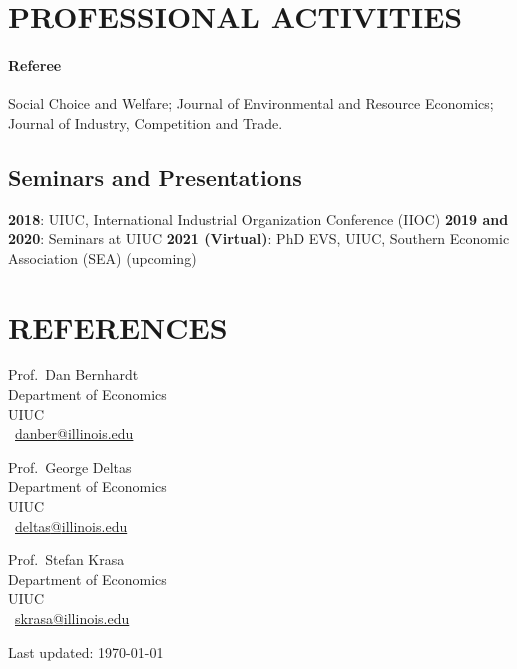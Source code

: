 \documentclass{article}
\begin{document}
\section{PROFESSIONAL ACTIVITIES}
\paragraph{Referee} Social Choice and Welfare; Journal of Environmental and Resource Economics; Journal of Industry, Competition and Trade.
\subsection{Seminars and Presentations}
{\bf 2018}: UIUC, International Industrial Organization Conference (IIOC) {\bf 2019 and 2020}: Seminars at UIUC {\bf 2021 (Virtual)}: PhD EVS, UIUC, Southern Economic Association (SEA) (upcoming)



\section{REFERENCES}
\begin{paracol}{3}

    \noindent Prof.\ Dan Bernhardt\\
    Department of Economics\\
    UIUC\\
    \Letter\ \href{mailto:danber@illinois.edu}{danber\textrm{@}illinois.edu}

\switchcolumn

    \noindent Prof.\ George Deltas\\
    Department of Economics\\
    UIUC\\
    \Letter\ \href{mailto:deltas@illinois.edu}{deltas\textrm{@}illinois.edu}

\switchcolumn

    \noindent Prof.\ Stefan Krasa\\
    Department of Economics\\
    UIUC\\
    \Letter\ \href{skrasa@illinois.edu}{skrasa\textrm{@}illinois.edu}

\end{paracol}

\vspace{5em}
\begin{center}   
	\begin{small}     
	  Last updated: \today 
	\end{small} 
\end{center}
\end{document}

